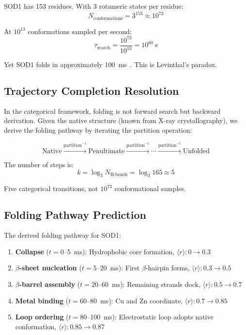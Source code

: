\documentclass[twocolumn,aps,prx,superscriptaddress,longbibliography]{revtex4-2}
\theoremstyle{remark}
\newcommand{\orderpar}{\langle r \rangle}
\begin{document}
SOD1 has 153 residues. With 3 rotameric states per residue:
\begin{equation}
N_\text{conformations} = 3^{153} \approx 10^{73}
\end{equation}

At $10^{13}$ conformations sampled per second:
\begin{equation}
\tau_\text{search} = \frac{10^{73}}{10^{13}} = 10^{60}~\text{s}
\end{equation}

Yet SOD1 folds in approximately 100~ms~\cite{Lindberg2004}. This is
Levinthal's paradox.

\subsection{Trajectory Completion Resolution}

In the categorical framework, folding is not forward search but backward
derivation. Given the native structure (known from X-ray crystallography),
we derive the folding pathway by iterating the partition operation:

\begin{equation}
\text{Native} \xrightarrow{\text{partition}^{-1}} \text{Penultimate}
\xrightarrow{\text{partition}^{-1}} \cdots \xrightarrow{\text{partition}^{-1}}
\text{Unfolded}
\end{equation}

The number of steps is:
\begin{equation}
k = \log_3 N_\text{H-bonds} = \log_3 165 \approx 5
\end{equation}

Five categorical transitions, not $10^{73}$ conformational samples.

\subsection{Folding Pathway Prediction}

The derived folding pathway for SOD1:

\begin{enumerate}
    \item \textbf{Collapse} ($t = 0$--5~ms): Hydrophobic core formation,
    $\orderpar: 0 \to 0.3$

    \item \textbf{$\beta$-sheet nucleation} ($t = 5$--20~ms): First
    $\beta$-hairpin forms, $\orderpar: 0.3 \to 0.5$

    \item \textbf{$\beta$-barrel assembly} ($t = 20$--60~ms): Remaining
    strands dock, $\orderpar: 0.5 \to 0.7$

    \item \textbf{Metal binding} ($t = 60$--80~ms): Cu and Zn coordinate,
    $\orderpar: 0.7 \to 0.85$

    \item \textbf{Loop ordering} ($t = 80$--100~ms): Electrostatic loop
    adopts native conformation, $\orderpar: 0.85 \to 0.87$
\end{enumerate}
\end{document}
